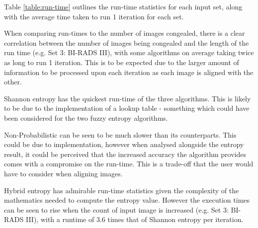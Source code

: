 Table \ref{table:run-time} outlines the run-time statistics for each input set, along with the average time taken to run 1 iteration for each set.

When comparing run-times to the number of images congealed, there is a clear correlation between the number of images being congealed and the length of the run time (e.g. Set 3: BI-RADS III), with some algorithms on average taking twice as long to run 1 iteration. This is to be expected due to the larger amount of information to be processed upon each iteration as each image is aligned with the other.

Shannon entropy has the quickest run-time of the three algorithms. This is likely to be due to the implementation of a lookup table - something which could have been considered for the two fuzzy entropy algorithms.

Non-Probabilistic can be seen to be much slower than its counterparts. This could be due to implementation, however when analysed alongside the entropy result, it could be perceived that the increased accuracy the algorithm provides comes with a compromise on the run-time. This is a trade-off that the user would have to consider when aligning images.

Hybrid entropy has admirable run-time statistics given the complexity of the mathematics needed to compute the entropy value. However the execution times can be seen to rise when the count of input image is increased (e.g. Set 3: BI-RADS III), with a runtime of 3.6 times that of Shannon entropy per iteration.
